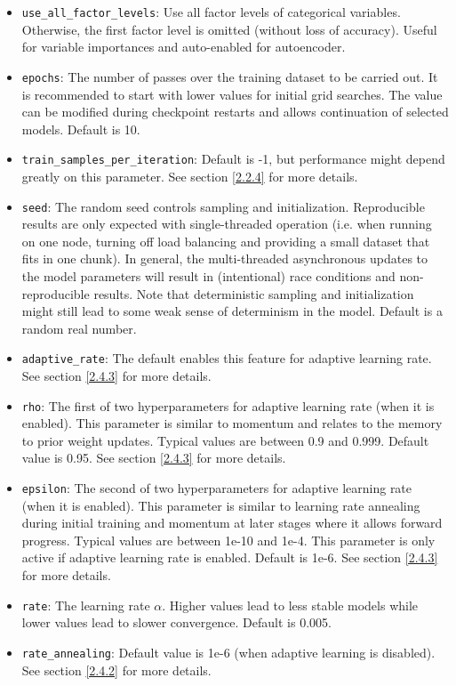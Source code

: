 \documentclass[11pt]{article}
\begin{document}
\begin{itemize}
\item \texttt{use\_all\_factor\_levels}: Use all factor levels of categorical variables. Otherwise, the first factor level is omitted (without loss of accuracy). Useful for variable importances and auto-enabled for autoencoder.
\item \texttt{epochs}: The number of passes over the training dataset to be carried out. It is recommended to start with lower values for initial grid searches. The value can be modified during checkpoint restarts and allows continuation of selected models. Default is 10.
\item \texttt{train\_samples\_per\_iteration}: Default is -1, but performance might depend greatly on this parameter. See section \ref{2.2.4} for more details.
\item \texttt{seed}: The random seed controls sampling and initialization. Reproducible results are only expected with single-threaded operation (i.e. when running on one node, turning off load balancing and providing a small dataset that fits in one chunk).  In general, the multi-threaded asynchronous updates to the model parameters will result in (intentional) race conditions and non-reproducible results. Note that deterministic sampling and initialization might still lead to some weak sense of determinism in the model. Default is a random real number.
\item \texttt{adaptive\_rate}: The default enables this feature for adaptive learning rate. See section \ref{2.4.3}  for more details.
\item \texttt{rho}: The first of two hyperparameters for adaptive learning rate (when it is enabled). This parameter is similar to momentum and relates to the memory to prior weight updates. Typical values are between 0.9 and 0.999. Default value is 0.95. See section \ref{2.4.3} for more details.
\item \texttt{epsilon}: The second of two hyperparameters for adaptive learning rate (when it is enabled). This parameter is similar to learning rate annealing during initial training and momentum at later stages where it allows forward progress. Typical values are between 1e-10 and 1e-4. This parameter is only active if adaptive learning rate is enabled. Default is 1e-6. See section \ref{2.4.3} for more details.
\item \texttt{rate}: The learning rate $\alpha$. Higher values lead to less stable models  while lower values  lead to slower convergence. Default is 0.005.
\item \texttt{rate\_annealing}: Default value is 1e-6 (when adaptive learning is disabled). See section \ref{2.4.2} for more details.

\end{itemize}
\end{document}

